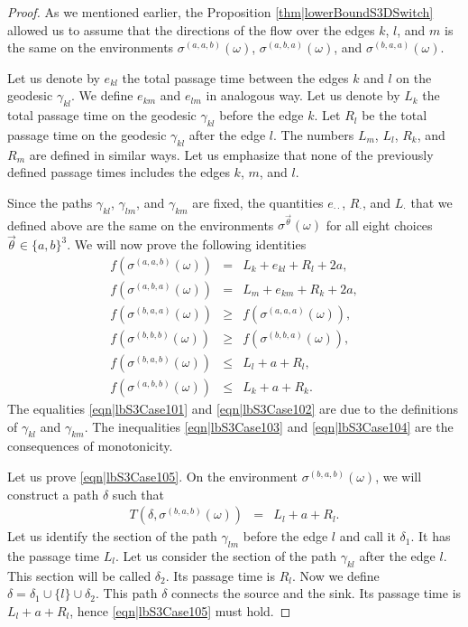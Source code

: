 \documentclass[reqno]{amsart}
\begin{document}
\begin{proof}
As we mentioned earlier, the Proposition \ref{thm|lowerBoundS3DSwitch} allowed us to assume that the directions of the flow over the edges $k$, $l$, and $m$ is the same on the environments 
$\sigma^{(a,a,b)}(\omega)$, $\sigma^{(a,b,a)}(\omega)$, and $\sigma^{(b,a,a)}(\omega)$.  

Let us denote by $e_{kl}$ the total passage time between the edges $k$ and $l$ on the geodesic $\gamma_{kl}$. We define $e_{km}$ and $e_{lm}$ in analogous way. 
Let us denote by $L_k$ the total passage time on the geodesic $\gamma_{kl}$ before the edge $k$. Let $R_l$ be the total passage time on the geodesic $\gamma_{kl}$ after the edge $l$. 
The numbers $L_m$, $L_l$, $R_k$, and $R_m$ are defined in similar ways. Let us emphasize that none of the previously defined passage times includes the edges $k$, $m$, and $l$. 

Since the paths $\gamma_{kl}$, $\gamma_{lm}$, and $\gamma_{km}$ are fixed, the quantities $e_{\cdot\cdot}$, $R_{\cdot}$, and $L_{\cdot}$ that we defined 
above are the same on the environments $\sigma^{\overrightarrow{\theta}}(\omega)$ for all eight choices $\overrightarrow \theta \in\{a,b\}^3$.
We will now prove the following identities
\begin{eqnarray}
f(\sigma^{(a,a,b)}(\omega))&=&L_k+e_{kl}+R_l+2a,\label{eqn|lbS3Case101}\\
f(\sigma^{(a,b,a)}(\omega))&=&L_m+e_{km}+R_k+2a,\label{eqn|lbS3Case102}\\
f(\sigma^{(b,a,a)}(\omega))&\geq& f(\sigma^{(a,a,a)}(\omega)),\label{eqn|lbS3Case103}\\
f(\sigma^{(b,b,b)}(\omega))&\geq& f(\sigma^{(b,b,a)}(\omega)),\label{eqn|lbS3Case104}\\
f(\sigma^{(b,a,b)}(\omega))&\leq& L_l+a+R_l,\label{eqn|lbS3Case105}\\
f(\sigma^{(a,b,b)}(\omega))&\leq& L_k+a+R_k.\label{eqn|lbS3Case106}
\end{eqnarray}
The equalities \eqref{eqn|lbS3Case101} and \eqref{eqn|lbS3Case102} are due to the definitions of $\gamma_{kl}$ and $\gamma_{km}$. The inequalities \eqref{eqn|lbS3Case103} and 
\eqref{eqn|lbS3Case104} are the consequences of monotonicity. 


Let us prove \eqref{eqn|lbS3Case105}. On the environment $\sigma^{(b,a,b)}(\omega)$, we
will construct a path $\delta$ such that 
\begin{eqnarray*}T(\delta, \sigma^{(b,a,b)}(\omega)) &=& L_l+a+R_l.
\end{eqnarray*}
Let us identify the section of the path $\gamma_{lm}$ before the edge $l$ and call it $\delta_1$. 
It has the passage time $L_l$. Let us consider the section of the path $\gamma_{kl}$ after the edge $l$. 
This section will be called $\delta_2$. Its passage time is $R_l$. 
Now we define $\delta=\delta_1\cup\{l\}\cup \delta_2$. This path $\delta$ connects the source and the sink. Its passage time is $L_l+a+R_l$, hence \eqref{eqn|lbS3Case105} must hold. 


\end{proof}
\end{document}
